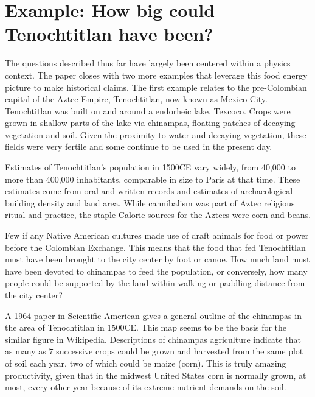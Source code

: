 \documentclass[prb,preprint]{revtex4-2}
\begin{document}
\clearpage

\section{Example: How big could Tenochtitlan have been?}
The questions described thus far have largely been centered within a physics context.  The paper closes with two more examples that leverage this food energy picture to make historical claims.  The first example relates to the pre-Colombian capital of the Aztec Empire, Tenochtitlan, now known as Mexico City.  Tenochtitlan was built on and around a endorheic lake, Texcoco.  Crops were grown in shallow parts of the lake via chinampas,\cite{national_geo} floating patches of decaying vegetation and soil.  Given the proximity to water and decaying vegetation, these fields were very fertile\cite{HortTech_2019,Chinampas_1964} and some continue to be used in the present day.\cite{google_earth}  


Estimates of Tenochtitlan's population in 1500CE vary widely, from 40,000\cite{40k} to more than 400,000\cite{400k} inhabitants, comparable in size to Paris at that time. These estimates come from oral and written records and estimates of archaeological building density and land area.   While cannibalism was part of Aztec religious ritual and practice,\cite{Aztec_Cannibalism} the staple Calorie sources for the Aztecs were corn and beans.

Few if any Native American cultures made use of draft animals for food or power before the Colombian Exchange.  This means that the food that fed Tenochtitlan must have been brought to the city center by foot or canoe.  How much land must have been devoted to chinampas to feed the population, or conversely, how many people could be supported by the land within walking or paddling distance from the city center?

A 1964 paper in Scientific American\cite{Chinampas_1964} gives a general outline of the chinampas in the area of Tenochtitlan in 1500CE.  This map seems to be the basis for the similar figure in Wikipedia.\cite{chinampas_wikipedia}  
Descriptions of chinampas agriculture indicate that as many as $7$ successive crops could be grown and harvested from the same plot of soil each year, two of which could be maize (corn).  This is truly amazing productivity, given that in the midwest United States corn is normally grown, at most, every other year because of its extreme nutrient demands on the soil.
\end{document}
